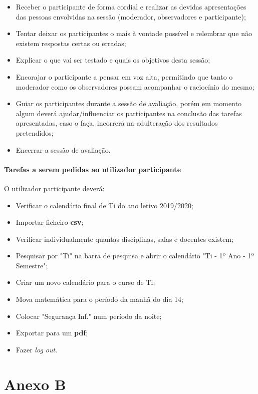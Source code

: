 \documentclass[11pt, twoside]{report}
\begin{document}
	\begin{itemize}
		\item Receber o participante de forma cordial e realizar as devidas apresentações das pessoas envolvidas na sessão (moderador, observadores e participante);
		\item Tentar deixar os participantes o mais à vontade possível e relembrar que não existem respostas certas ou erradas;
		\item Explicar o que vai ser testado e quais os objetivos desta sessão;
		\item Encorajar o participante a pensar em voz alta, permitindo que tanto o moderador como os observadores possam acompanhar o raciocínio do mesmo;
		\item Guiar os participantes durante a sessão de avaliação, porém em momento algum deverá ajudar/influenciar os participantes na conclusão das tarefas apresentadas, caso o faça, incorrerá na adulteração dos resultados pretendidos;
		\item Encerrar a sessão de avaliação.
	\end{itemize}
	
	\subsubsection*{Tarefas a serem pedidas ao utilizador participante}	
	O utilizador participante deverá:
	
		\begin{itemize}
			\item Verificar o calendário final de Ti do ano letivo 2019/2020;
			\item Importar ficheiro \textbf{csv};
			\item Verificar individualmente quantas disciplinas, salas e docentes existem;
			\item Pesquisar por "Ti" na barra de pesquisa e abrir o calendário "Ti - 1º Ano - 1º Semestre";
			\item Criar um novo calendário para o curso de Ti;
			\item Mova matemática para o período da manhã do dia 14;
			\item Colocar "Segurança Inf." num período da noite;
			\item Exportar para um \textbf{pdf};
			\item Fazer \textit{log out}.
		\end{itemize}
	
	
	\chapter*{Anexo B}
\end{document}
